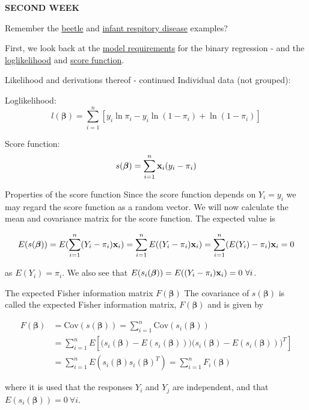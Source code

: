 \documentclass[
  ignorenonframetext,
]{beamer}
\begin{document}
\begin{frame}
\textbf{SECOND WEEK}

Remember the \protect\hyperlink{beetle1}{beetle} and
\protect\hyperlink{infant1}{infant respitory disease} examples?

First, we look back at the \protect\hyperlink{binaryregassump}{model
requirements} for the binary regression - and the
\protect\hyperlink{loglik}{loglikelihood} and
\protect\hyperlink{score}{score function}.
\end{frame}

\begin{frame}{Likelihood and derivations thereof - continued}
\protect\hypertarget{likelihood-and-derivations-thereof---continued}{}
Individual data (not grouped):

Loglikelihood:
\[l(\boldsymbol{\beta})=\sum_{i=1}^n[y_i \ln \pi_i-y_i\ln(1-\pi_i)+\ln(1-\pi_i)]\]

Score function:
\[s(\boldsymbol{\beta})=\sum_{i=1}^n {\bf x}_i (y_i-\pi_i)\]
\end{frame}

\begin{frame}
\begin{block}{Properties of the score function}
\protect\hypertarget{properties-of-the-score-function}{}
Since the score function depends on \(Y_i=y_i\) we may regard the score
function as a random vector. We will now calculate the mean and
covariance matrix for the score function. The expected value is

\[E(s(\boldsymbol{\beta})) = E(\sum_{i=1}^n(Y_i-\pi_i){\bf x}_i) = \sum_{i=1}^nE((Y_i-\pi_i){\bf x}_i) = \sum_{i=1}^n(E(Y_i)-\pi_i){\bf x}_i = 0 \]

as \(E(Y_i) = \pi_i\). We also see that
\(E(s_i(\boldsymbol{\beta})) = E((Y_i-\pi_i){\bf x}_i) = 0 \ \forall i\).
\end{block}
\end{frame}

\begin{frame}
\begin{block}{The expected Fisher information matrix
\(F(\boldsymbol{\beta})\)}
\protect\hypertarget{the-expected-fisher-information-matrix-fboldsymbolbeta}{}
The covariance of \(s(\boldsymbol{\beta})\) is called the expected
Fisher information matrix, \(F(\boldsymbol{\beta})\) and is given by

\begin{align} F(\boldsymbol{\beta}) &= \text{Cov}(s(\boldsymbol{\beta})) =   \sum_{i=1}^n \text{Cov}(s_i(\boldsymbol{\beta})) \\
&= \sum_{i=1}^n E\left[\Big(s_i(\boldsymbol{\beta}) - E(s_i(\boldsymbol{\beta}))\Big)\Big(s_i(\boldsymbol{\beta})-E(s_i(\boldsymbol{\beta}))\Big)^T\right] \\
&= \sum_{i=1}^n E(s_i(\boldsymbol{\beta})s_i(\boldsymbol{\beta})^T) = \sum_{i=1}^n F_i(\boldsymbol{\beta}) 
\end{align}

where it is used that the responses \(Y_i\) and \(Y_j\) are independent,
and that \(E(s_i(\boldsymbol{\beta})) = 0 \ \forall i\).
\end{block}
\end{frame}
\end{document}
